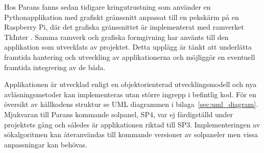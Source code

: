         Hos Parans fanns sedan tidigare kringutrustning som använder en Pythonapplikation med grafiskt gränssnitt anpassat till en pekskärm på en Raspberry Pi, där det grafiska gränssnittet är implementerat med ramverket TkInter \cite{solarremote}. Samma ramverk och grafiska formgivning har använts till den applikation som utvecklats av projektet. Detta upplägg är tänkt att underlätta framtida hantering och utveckling av applikationerna och möjliggör en eventuell framtida integrering av de båda. \bigskip

        Applikationen är utvecklad enligt en objektorienterad utvecklingsmodell och nya avläsningsmetoder kan implementeras utan större ingrepp i befintlig kod. För en översikt av källkodens struktur se UML diagrammen i bilaga~\ref{sec:uml_diagram}. Mjukvaran till Parans kommande solpanel, SP4, var ej färdigställd under projektets gång och således är applikationen riktad till SP3. Implementeringen av sökalgoritmen kan återanvändas till kommande versioner av solpaneler men vissa anpassningar kan behövas.
